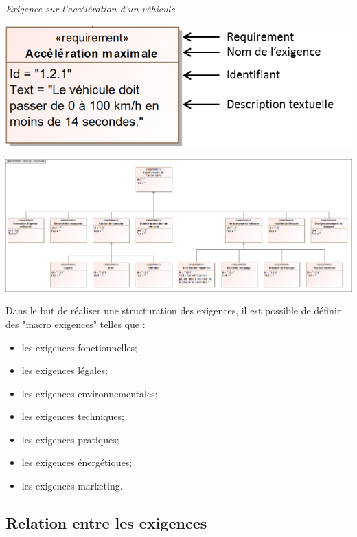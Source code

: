 \documentclass[11pt,oneside]{article}
\begin{document}
\begin{exemple}
\textit{Exigence sur l'accélération d'un véhicule}

\begin{center}
\includegraphics[width=.4\textwidth]{png/exigence}
\end{center}
\end{exemple}



\begin{exemple}
\begin{center}
\includegraphics[width=\textwidth]{png/DiagrammeExigences}
\end{center}
\end{exemple}


\begin{rem}
Dans le but de réaliser une structuration des exigences, il est possible de définir des "macro exigences" telles que : 
\begin{itemize}
\item les exigences fonctionnelles;
\item les exigences légales;
\item les exigences environnementales;
\item les exigences techniques;
\item les exigences pratiques;
\item les exigences énergétiques;
\item les exigences marketing.
\end{itemize}
\end{rem}


\subsection{Relation entre les exigences}
\end{document}
